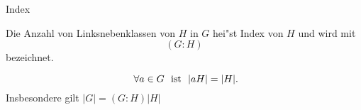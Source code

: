 \documentclass[class=article, crop=false]{standalone}
\begin{document}
\begin{zettel}{Index}
\begin{flashcard}[]{}
	\begin{definition}[Index]
		Die Anzahl von Linksnebenklassen von $H$ in $G$ hei"st Index von $H$ und wird mit
		\[
			(G:H)
		\]
		bezeichnet.
	\end{definition}
\end{flashcard}
\begin{theorem}
	\[
		\forall a \in  G \tx{ ist } |aH| = |H|
	.\]
	Insbesondere gilt $ |G| = (G:H) |H|$
\end{theorem}
\end{zettel}
\end{document}
